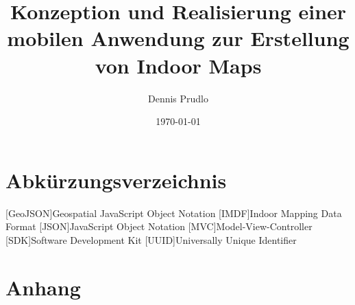 \documentclass[a4paper, 12pt, twoside]{report}
\title{Konzeption und Realisierung einer mobilen Anwendung zur Erstellung von Indoor Maps}
\author{Dennis Prudlo}
\date{\today}
\newcounter{currentpage}
\begin{document}
	

	\pagestyle{plain}

	
	

	\tableofcontents
	\clearpage

	\listoffigures
	\clearpage

	\listoftables
	\clearpage

	\chapter*{Abkürzungsverzeichnis}
	\begin{acronym}
		[GeoJSON]{Geospatial JavaScript Object Notation}
		{Indoor Mapping Data Format}
		{JavaScript Object Notation}
		[MVC]{Model-View-Controller}
		[SDK]{Software Development Kit}
		{Universally Unique Identifier}
	\end{acronym}
	\clearpage


	\pagestyle{fancy}
	\setcounter{page}{\thecurrentpage}

	
	
	
	
	
	
	\clearpage

	\pagestyle{plain}
	\setcounter{page}{\thecurrentpage}

	\printbibliography
	\clearpage

	\printglossary
	\clearpage

	\chapter*{Anhang}
	\appendix
	\clearpage

\end{document}

